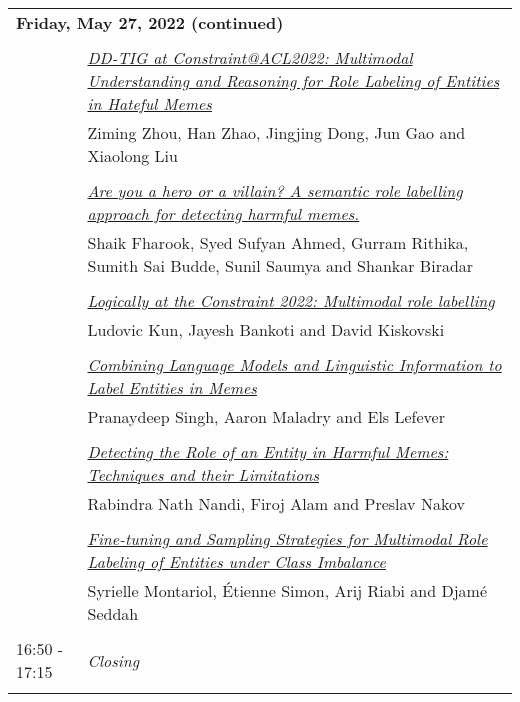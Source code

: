 \documentclass[11pt,oneside]{book}
\begin{document}
          \begin{tabular}{p{24mm}p{124mm}}
    \multicolumn{2}{l}{\bf Friday, May 27, 2022 (continued)} \\\\
          
                      & \hyperlink{page.12}{\emph{DD-TIG at Constraint@ACL2022: Multimodal Understanding and Reasoning for Role Labeling of Entities in Hateful Memes}}\\
        & Ziming Zhou, Han Zhao, Jingjing Dong, Jun Gao and Xiaolong Liu\\\\
                
                      & \hyperlink{page.19}{\emph{Are you a hero or a villain? A semantic role labelling approach for detecting harmful memes.}}\\
        & Shaik Fharook, Syed Sufyan Ahmed, Gurram Rithika, Sumith Sai Budde, Sunil Saumya and Shankar Biradar\\\\
                
                      & \hyperlink{page.24}{\emph{Logically at the Constraint 2022: Multimodal role labelling}}\\
        & Ludovic Kun, Jayesh Bankoti and David Kiskovski\\\\
                
                      & \hyperlink{page.35}{\emph{Combining Language Models and Linguistic Information to Label Entities in Memes}}\\
        & Pranaydeep Singh, Aaron Maladry and Els Lefever\\\\
                
                      & \hyperlink{page.43}{\emph{Detecting the Role of an Entity in Harmful Memes: Techniques and their Limitations}}\\
        & Rabindra Nath Nandi, Firoj Alam and Preslav Nakov\\\\
                
                      & \hyperlink{page.55}{\emph{Fine-tuning and Sampling Strategies for Multimodal Role Labeling of Entities under Class Imbalance}}\\
        & Syrielle Montariol, Étienne Simon, Arij Riabi and Djamé Seddah\\\\
                      16:50 - 17:15 & \emph{Closing}\\\\
      
              \end{tabular}
    \newpage
      
\end{document}

